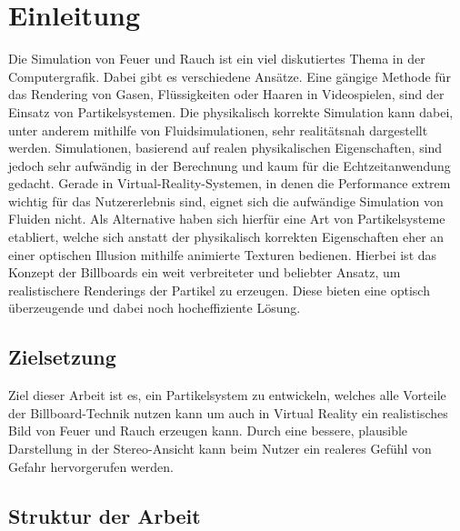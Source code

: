 \section{Einleitung}
\noindent
Die Simulation von Feuer und Rauch ist ein viel diskutiertes Thema in der Computergrafik.
Dabei gibt es verschiedene Ansätze.
Eine gängige Methode für das Rendering von Gasen, Flüssigkeiten oder Haaren in Videospielen, sind der 
Einsatz von Partikelsystemen. Die physikalisch korrekte Simulation kann dabei, unter anderem mithilfe von 
Fluidsimulationen, sehr realitätsnah dargestellt werden.
Simulationen, basierend auf realen physikalischen Eigenschaften, sind jedoch sehr aufwändig in der Berechnung
und kaum für die Echtzeitanwendung gedacht.
Gerade in Virtual-Reality-Systemen, in denen die Performance extrem wichtig für das Nutzererlebnis sind,
eignet sich die aufwändige Simulation von Fluiden nicht. Als Alternative haben sich hierfür eine Art von
Partikelsysteme etabliert, welche sich anstatt der physikalisch korrekten Eigenschaften eher an einer 
optischen Illusion mithilfe animierte Texturen bedienen. Hierbei ist das Konzept der Billboards ein weit 
verbreiteter und beliebter Ansatz, um realistischere Renderings der Partikel zu erzeugen. 
Diese bieten eine optisch überzeugende und dabei noch hocheffiziente Lösung.



\subsection{Zielsetzung}

Ziel dieser Arbeit ist es, ein Partikelsystem zu entwickeln, welches alle Vorteile der Billboard-Technik 
nutzen kann um auch in Virtual Reality ein realistisches Bild von Feuer und Rauch erzeugen kann. Durch eine 
bessere, plausible Darstellung in der Stereo-Ansicht kann beim Nutzer ein realeres Gefühl von Gefahr 
hervorgerufen werden. 

\subsection{Struktur der Arbeit}


\newpage
